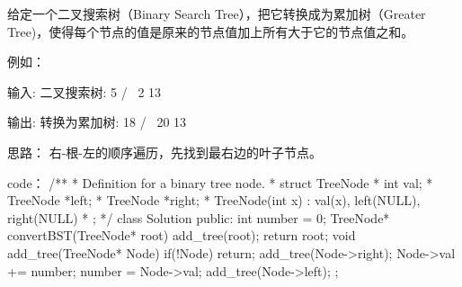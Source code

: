 给定一个二叉搜索树（Binary Search Tree），把它转换成为累加树（Greater Tree)，使得每个节点的值是原来的节点值加上所有大于它的节点值之和。

例如：

输入: 二叉搜索树:
              5
            /   \
           2     13

输出: 转换为累加树:
             18
            /   \
          20     13


























思路：
右-根-左的顺序遍历，先找到最右边的叶子节点。

























code：
/**
 * Definition for a binary tree node.
 * struct TreeNode {
 *     int val;
 *     TreeNode *left;
 *     TreeNode *right;
 *     TreeNode(int x) : val(x), left(NULL), right(NULL) {}
 * };
 */
class Solution {
public:
    int number = 0;
    TreeNode* convertBST(TreeNode* root) {
        add_tree(root);
        return root;
    }
    void add_tree(TreeNode* Node)
    {
        if(!Node) return;
        add_tree(Node->right);
        Node->val += number;
        number = Node->val;
        add_tree(Node->left);
    }
};